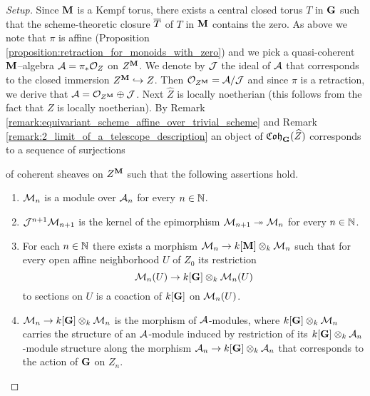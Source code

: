 \begin{proof}[Setup]
Since $\mathbf{M}$ is a Kempf torus, there exists a central closed torus $T$ in $\mathbf{G}$ such that the scheme-theoretic closure $\overline{T}$ of $T$ in $\mathbf{M}$ contains the zero. As above we note that $\pi$ is affine (Proposition \ref{proposition:retraction_for_monoids_with_zero}) and we pick a quasi-coherent $\mathbf{M}$--algebra ${\mathcal A} = \pi_*{\mathcal O}_Z$ on $Z^{\mathbf{M}}$. We denote by ${\mathcal J}$ the ideal of ${\mathcal A}$ that corresponds to the closed immersion $Z^{\mathbf{M}}\hookrightarrow Z$. Then ${\mathcal O}_{Z^{\mathbf{M}}} = {\mathcal A}/{\mathcal J}$ and since $\pi$ is a retraction, we derive that ${\mathcal A} = {\mathcal O}_{Z^{\mathbf{M}}}\oplus {\mathcal J}$. Next $\widehat{Z}$ is locally noetherian (this follows from the fact that $Z$ is locally noetherian). By Remark \ref{remark:equivariant_scheme_affine_over_trivial_scheme} and Remark \ref{remark:2_limit_of_a_telescope_description} an object of $\mathfrak{Coh}_{\mathbf{G}}(\widehat{Z})$ corresponds to a sequence of surjections
\begin{center}
\end{center}
of coherent sheaves on $Z^{\mathbf{M}}$ such that the following assertions hold.
\begin{enumerate}[label=\textbf{(\arabic*)}, leftmargin=3.0em]
\item ${\mathcal M}_n$ is a module over ${\mathcal A}_n$ for every $n\in {\mathbb N}$.
\item ${\mathcal J}^{n+1}{\mathcal M}_{n+1}$ is the kernel of the epimorphism ${\mathcal M}_{n+1}\twoheadrightarrow {\mathcal M}_n$ for every $n\in {\mathbb N}$.
\item For each $n\in {\mathbb N}$ there exists a morphism ${\mathcal M}_n\rightarrow k[\mathbf{M}]\otimes_k{\mathcal M}_n$ such that for every open affine neighborhood $U$ of $Z_0$ its restriction 
$${\mathcal M}_n(U)\rightarrow k[\mathbf{G}]\otimes_k {\mathcal M}_n(U)$$
to sections on $U$ is a coaction of $k[\mathbf{G}]$ on ${\mathcal M}_n(U)$.
\item ${\mathcal M}_n \rightarrow k[\mathbf{G}]\otimes_k{\mathcal M}_n$ is the morphism of ${\mathcal A}$-modules, where $k[\mathbf{G}]\otimes_k{\mathcal M}_n$ carries the structure of an ${\mathcal A}$-module induced by restriction of its $k[\mathbf{G}]\otimes_k{\mathcal A}_n$-module structure along the morphism ${\mathcal A}_n\rightarrow k[\mathbf{G}]\otimes_k{\mathcal A}_n$ that corresponds to the action of $\mathbf{G}$ on $Z_n$.

\end{enumerate}
\end{proof}
